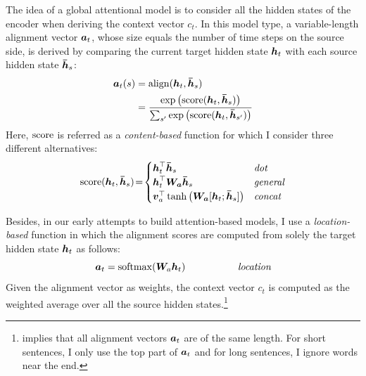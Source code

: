 The idea of a global attentional model is to consider all the hidden states of
the encoder when deriving the context vector $c_t$. In this model type, a
variable-length alignment vector $\mbox{\boldmath{$a$}}_{t}$, whose size equals the number of time
steps on the source side, is derived by comparing the current target hidden
state $\mbox{\boldmath{$h$}}_{t}$ with each source hidden state $\mbox{\boldmath{$\bar{h}$}}_{s}$:
\begin{align}
\label{e:al}
\mbox{\boldmath{$a$}}_{t}(s)&=\operatorname{align}(\mbox{\boldmath{$h$}}_{t}, \mbox{\boldmath{$\bar{h}$}}_{s}) \\
&=\frac{\exp \left(\operatorname{score}(\mbox{\boldmath{$h$}}_{t}, \mbox{\boldmath{$\bar{h}$}}_{s})\right)}{\sum_{s'} \exp \left(\operatorname{score}(\mbox{\boldmath{$h$}}_{t},
\mbox{\boldmath{$\bar{h}$}}_{s'})\right)} \notag
\end{align}
Here, $\operatorname{score}$ is referred as a {\it content-based} function for which I consider three different
alternatives:
\begin{equation*}
\operatorname{score}(\mbox{\boldmath{$h$}}_{t}, \mbox{\boldmath{$\bar{h}$}}_{s})\!=\!\begin{cases}
    \mbox{\boldmath{$h$}}_{t}^\top \mbox{\boldmath{$\bar{h}$}}_{s} & \mbox{{\it dot}}\\
    \mbox{\boldmath{$h$}}_{t}^\top \mbox{\boldmath{$W_a$}} \mbox{\boldmath{$\bar{h}$}}_{s} & \mbox{{\it general}} \\
    \mbox{\boldmath{$v$}}_a^\top\tanh\left(\mbox{\boldmath{$W_a$}} [\mbox{\boldmath{$h$}}_{t}; \mbox{\boldmath{$\bar{h}$}}_{s}]\right) & \mbox{{\it concat}}
\end{cases}
\end{equation*}

Besides, in our early attempts to build attention-based models, I use
a {\it location-based} function in which the alignment scores are
computed from solely the target hidden state $\mbox{\boldmath{$h$}}_{t}$ as
follows:
\begin{equation}
\mbox{\boldmath{$a$}}_{t} = \operatorname{softmax}(\bm{W}_{a}\mbox{\boldmath{$h$}}_{t}) \mbox{ } \mbox{ } \mbox{ } \mbox{ } \mbox{ } \mbox{ } \mbox{ } \mbox{ } \mbox{ } \mbox{ } \mbox{ } \mbox{ } \mbox{ } \mbox{ } \mbox{ } \mbox{ } \mbox{{\it location}}
\label{e:location}
\end{equation}
Given the alignment vector as weights, the
context vector $c_t$ is computed as the  weighted average over all the source hidden states.\footnote{ implies that
all alignment vectors $\mbox{\boldmath{$a$}}_{t}$ are of the same length. For short sentences, I only
use the top part of $\mbox{\boldmath{$a$}}_{t}$ and for long sentences, I ignore words near the end.}


